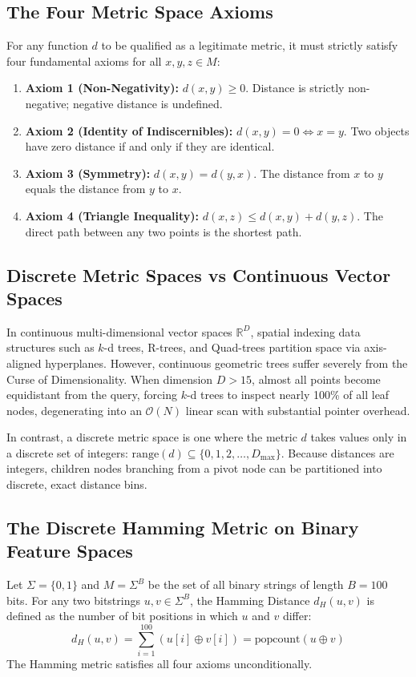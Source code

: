 \documentclass[11pt,a4paper]{article}
\begin{document}
\subsection{The Four Metric Space Axioms}
For any function $d$ to be qualified as a legitimate metric, it must strictly satisfy four fundamental axioms for all $x, y, z \in M$:
\begin{enumerate}
    \item \textbf{Axiom 1 (Non-Negativity):} $d(x, y) \ge 0$. Distance is strictly non-negative; negative distance is undefined.
    \item \textbf{Axiom 2 (Identity of Indiscernibles):} $d(x, y) = 0 \iff x = y$. Two objects have zero distance if and only if they are identical.
    \item \textbf{Axiom 3 (Symmetry):} $d(x, y) = d(y, x)$. The distance from $x$ to $y$ equals the distance from $y$ to $x$.
    \item \textbf{Axiom 4 (Triangle Inequality):} $d(x, z) \le d(x, y) + d(y, z)$. The direct path between any two points is the shortest path.
\end{enumerate}

\subsection{Discrete Metric Spaces vs Continuous Vector Spaces}
In continuous multi-dimensional vector spaces $\mathbb{R}^D$, spatial indexing data structures such as $k$-d trees, R-trees, and Quad-trees partition space via axis-aligned hyperplanes. However, continuous geometric trees suffer severely from the Curse of Dimensionality. When dimension $D > 15$, almost all points become equidistant from the query, forcing $k$-d trees to inspect nearly 100\% of all leaf nodes, degenerating into an $\mathcal{O}(N)$ linear scan with substantial pointer overhead.

In contrast, a discrete metric space is one where the metric $d$ takes values only in a discrete set of integers: $\text{range}(d) \subseteq \{0, 1, 2, \dots, D_{\max}\}$. Because distances are integers, children nodes branching from a pivot node can be partitioned into discrete, exact distance bins.

\subsection{The Discrete Hamming Metric on Binary Feature Spaces}
Let $\Sigma = \{0, 1\}$ and $M = \Sigma^B$ be the set of all binary strings of length $B = 100$ bits. For any two bitstrings $u, v \in \Sigma^B$, the Hamming Distance $d_H(u, v)$ is defined as the number of bit positions in which $u$ and $v$ differ:
\begin{equation}
d_H(u, v) = \sum_{i=1}^{100} (u[i] \oplus v[i]) = \text{popcount}(u \oplus v)
\end{equation}
The Hamming metric satisfies all four axioms unconditionally.
\end{document}
